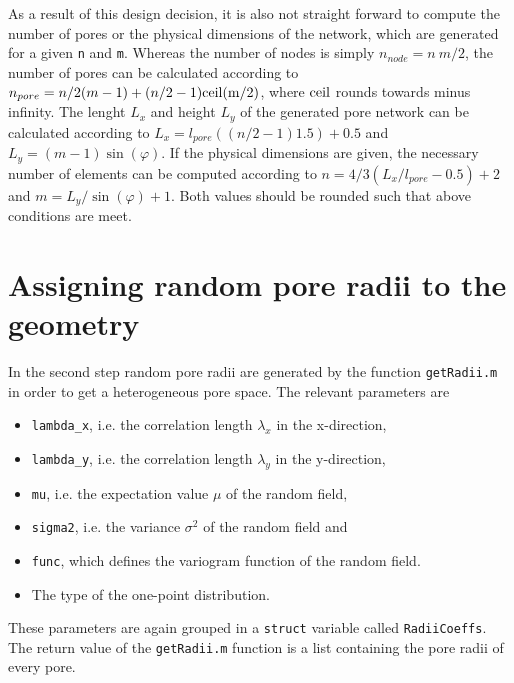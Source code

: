 \documentclass[12pt]{report}
\begin{document}
As a result of this design decision, it is also not straight forward to compute the number of pores or the physical dimensions of the network, which are generated for a given {\tt n} and {\tt m}. Whereas the number of nodes is simply $ n_{node} = n\ m/2 $, the number of pores can be calculated according to $ n_{pore} = n/2 (m-1) + (n/2-1) \rm{ceil}(m/2)$, where $\rm{ceil}$ rounds towards minus infinity. The lenght $L_x$ and height $L_y$ of the generated pore network can be calculated according to $L_x = l_{pore} ((n/2 - 1)1.5) + 0.5$ and $L_y = (m - 1)\sin(\varphi)$. If the physical dimensions are given, the necessary number of elements can be computed according to $n = 4/3(L_x/l_{pore} - 0.5) + 2$ and $m = L_y/\sin(\varphi) + 1$. Both values should be rounded such that above conditions are meet.

\section{Assigning random pore radii to the geometry}

In the second step random pore radii are generated by the function {\tt getRadii.m} in order to get a heterogeneous pore space. The relevant parameters are

\begin{itemize}
	\item {\tt lambda\_x}, i.e. the correlation length $\lambda_x$ in the x-direction,
	\item {\tt lambda\_y}, i.e. the correlation length $\lambda_y$ in the y-direction,
	\item {\tt mu}, i.e. the expectation value $\mu$ of the random field,
	\item {\tt sigma2}, i.e. the variance $\sigma^2$ of the random field and
	\item {\tt func}, which defines the variogram function of the random field. 
	\item The type of the one-point distribution.
\end{itemize}

These parameters are again grouped in a {\tt struct} variable called {\tt RadiiCoeffs}. The return value of the {\tt getRadii.m} function is a list containing the pore radii of every pore.
\end{document}
